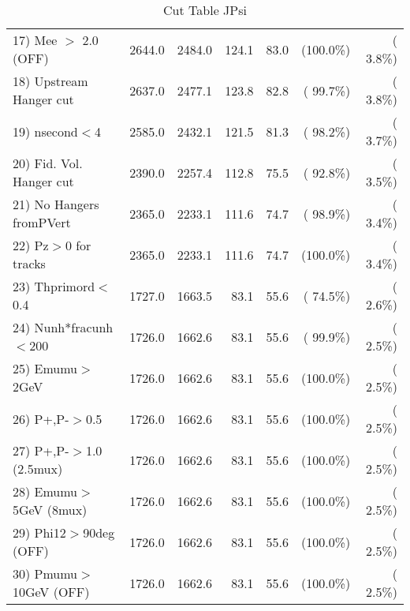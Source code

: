 \begin{table}[h!]
\begin{tabular}{||l||r|r|r|r|r|r||}
 17) Mee $>$ 2.0  (OFF)   &       2644.0 &       2484.0 &        124.1 &         83.0 & (100.0\%) & (  3.8\%) \\
 18) Upstream Hanger cut  &       2637.0 &       2477.1 &        123.8 &         82.8 & ( 99.7\%) & (  3.8\%) \\
 19) nsecond$<$4          &       2585.0 &       2432.1 &        121.5 &         81.3 & ( 98.2\%) & (  3.7\%) \\
 20) Fid. Vol. Hanger cut &       2390.0 &       2257.4 &        112.8 &         75.5 & ( 92.8\%) & (  3.5\%) \\
 21) No Hangers fromPVert &       2365.0 &       2233.1 &        111.6 &         74.7 & ( 98.9\%) & (  3.4\%) \\
 22) Pz$>$0 for tracks    &       2365.0 &       2233.1 &        111.6 &         74.7 & (100.0\%) & (  3.4\%) \\
 23) Thprimord$<$0.4      &       1727.0 &       1663.5 &         83.1 &         55.6 & ( 74.5\%) & (  2.6\%) \\
 24) Nunh*fracunh$<$200   &       1726.0 &       1662.6 &         83.1 &         55.6 & ( 99.9\%) & (  2.5\%) \\
 25) Emumu$>$2GeV         &       1726.0 &       1662.6 &         83.1 &         55.6 & (100.0\%) & (  2.5\%) \\
 26) P+,P-$>$0.5          &       1726.0 &       1662.6 &         83.1 &         55.6 & (100.0\%) & (  2.5\%) \\
 27) P+,P-$>$1.0 (2.5mux) &       1726.0 &       1662.6 &         83.1 &         55.6 & (100.0\%) & (  2.5\%) \\
 28) Emumu$>$5GeV  (8mux) &       1726.0 &       1662.6 &         83.1 &         55.6 & (100.0\%) & (  2.5\%) \\
 29) Phi12$>$90deg  (OFF) &       1726.0 &       1662.6 &         83.1 &         55.6 & (100.0\%) & (  2.5\%) \\
 30) Pmumu$>$10GeV  (OFF) &       1726.0 &       1662.6 &         83.1 &         55.6 & (100.0\%) & (  2.5\%) \\
 \hline
 \hline
 \end{tabular}
 \caption{Cut Table  JPsi     }
 \label{tab-cutcohjpsi-mumu_cohrhop}
 \end{table}
